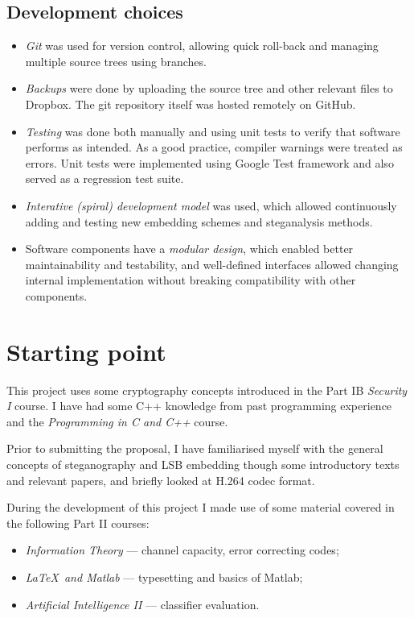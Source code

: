 \documentclass[12pt,british,twoside,notitlepage,usenames,dvipsnames,hypens,final]{report}
\numberwithin{equation}{section}
\numberwithin{figure}{section}
\begin{document}
\subsection{Development choices}
\begin{itemize}
\item \emph{Git} was used for version control, allowing quick roll-back and managing multiple source trees using branches.
\item \emph{Backups} were done by uploading the source tree and other relevant files to Dropbox. The git repository itself was hosted remotely on GitHub.
\item \emph{Testing} was done both manually and using unit tests to verify that software performs as intended. As a good practice, compiler warnings were treated as errors. Unit tests were implemented using Google Test framework and also served as a regression test suite.
\item \emph{Interative (spiral) development model} was used, which allowed continuously adding and testing new embedding schemes and steganalysis methods.
\item Software components have a \emph{modular design}, which enabled better maintainability and testability, and well-defined interfaces allowed changing internal implementation without breaking compatibility with other components.
\end{itemize}

\section{Starting point}
This project uses some cryptography concepts introduced in the Part IB \textit{Security I} course. I have had some C++ knowledge from past programming experience and the \textit{Programming in C and C++} course. 

Prior to submitting the proposal, I have familiarised myself with the general concepts of steganography and LSB embedding though some introductory texts and relevant papers, and briefly looked at H.264 codec format.

During the development of this project I made use of some material covered in the following Part II courses:
\begin{itemize}
\item \textit{Information Theory} --- channel capacity, error correcting codes;
\item \textit{\LaTeX~and Matlab} --- typesetting and basics of Matlab;
\item \textit{Artificial Intelligence II} --- classifier evaluation.
\end{itemize}
\end{document}
